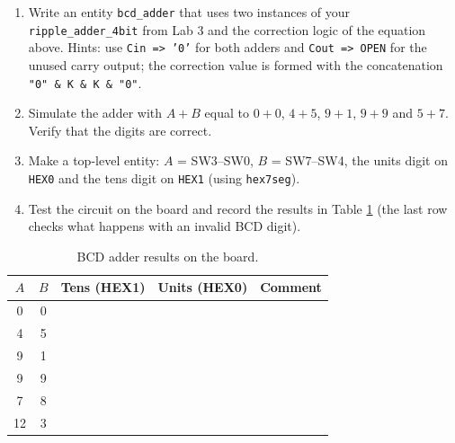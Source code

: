 \documentclass{article}
\begin{document}
\begin{enumerate}
    \item Write an entity \texttt{bcd\_adder} that uses two instances of your \texttt{ripple\_adder\_4bit} from Lab 3 and the correction logic of the equation above. Hints: use \texttt{Cin => '0'} for both adders and \texttt{Cout => OPEN} for the unused carry output; the correction value is formed with the concatenation \texttt{"0" \& K \& K \& "0"}.
    \item Simulate the adder with $A+B$ equal to $0+0$, $4+5$, $9+1$, $9+9$ and $5+7$. Verify that the digits are correct.
    \item Make a top-level entity: $A$ = SW3--SW0, $B$ = SW7--SW4, the units digit on \texttt{HEX0} and the tens digit on \texttt{HEX1} (using \texttt{hex7seg}).
    \item Test the circuit on the board and record the results in Table \ref{tab:bcd} (the last row checks what happens with an invalid BCD digit).
\end{enumerate}

\begin{table}[H]
    \centering
    \begin{tabular}{|c|c|c|c|c|}
        \hline
        $A$ & $B$ & Tens (HEX1) & Units (HEX0) & Comment \\
        \hline
        0 & 0 & & & \\
        4 & 5 & & & \\
        9 & 1 & & & \\
        9 & 9 & & & \\
        7 & 8 & & & \\
        12 & 3 & & & \\
        \hline
    \end{tabular}
    \caption{BCD adder results on the board.}
    \label{tab:bcd}
\end{table}
\end{document}
